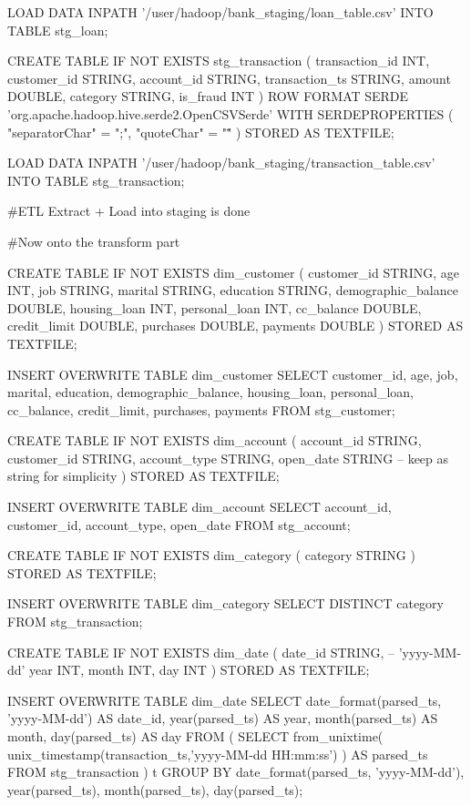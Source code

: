 LOAD DATA INPATH '/user/hadoop/bank_staging/loan_table.csv'
INTO TABLE stg_loan;

CREATE TABLE IF NOT EXISTS stg_transaction (
  transaction_id INT,
  customer_id    STRING,
  account_id     STRING,
  transaction_ts STRING,
  amount         DOUBLE,
  category       STRING,
  is_fraud       INT
)
ROW FORMAT SERDE 'org.apache.hadoop.hive.serde2.OpenCSVSerde'
WITH SERDEPROPERTIES (
  "separatorChar" = ";",
  "quoteChar"     = "\""
)
STORED AS TEXTFILE;

LOAD DATA INPATH '/user/hadoop/bank_staging/transaction_table.csv'
INTO TABLE stg_transaction;

#ETL Extract + Load into staging is done


#Now onto the transform part

CREATE TABLE IF NOT EXISTS dim_customer (
  customer_id         STRING,
  age                 INT,
  job                 STRING,
  marital             STRING,
  education           STRING,
  demographic_balance DOUBLE,
  housing_loan        INT,
  personal_loan       INT,
  cc_balance          DOUBLE,
  credit_limit        DOUBLE,
  purchases           DOUBLE,
  payments            DOUBLE
)
STORED AS TEXTFILE;

INSERT OVERWRITE TABLE dim_customer
SELECT
  customer_id,
  age,
  job,
  marital,
  education,
  demographic_balance,
  housing_loan,
  personal_loan,
  cc_balance,
  credit_limit,
  purchases,
  payments
FROM stg_customer;



CREATE TABLE IF NOT EXISTS dim_account (
  account_id   STRING,
  customer_id  STRING,
  account_type STRING,
  open_date    STRING      -- keep as string for simplicity
)
STORED AS TEXTFILE;

INSERT OVERWRITE TABLE dim_account
SELECT
  account_id,
  customer_id,
  account_type,
  open_date
FROM stg_account;






CREATE TABLE IF NOT EXISTS dim_category (
  category STRING
)
STORED AS TEXTFILE;

INSERT OVERWRITE TABLE dim_category
SELECT DISTINCT category
FROM stg_transaction;





CREATE TABLE IF NOT EXISTS dim_date (
  date_id STRING,   -- 'yyyy-MM-dd'
  year    INT,
  month   INT,
  day     INT
)
STORED AS TEXTFILE;

INSERT OVERWRITE TABLE dim_date
SELECT
  date_format(parsed_ts, 'yyyy-MM-dd') AS date_id,
  year(parsed_ts)                       AS year,
  month(parsed_ts)                      AS month,
  day(parsed_ts)                        AS day
FROM (
  SELECT
    from_unixtime(
      unix_timestamp(transaction_ts,'yyyy-MM-dd HH:mm:ss')
    ) AS parsed_ts
  FROM stg_transaction
) t
GROUP BY
  date_format(parsed_ts, 'yyyy-MM-dd'),
  year(parsed_ts),
  month(parsed_ts),
  day(parsed_ts);



